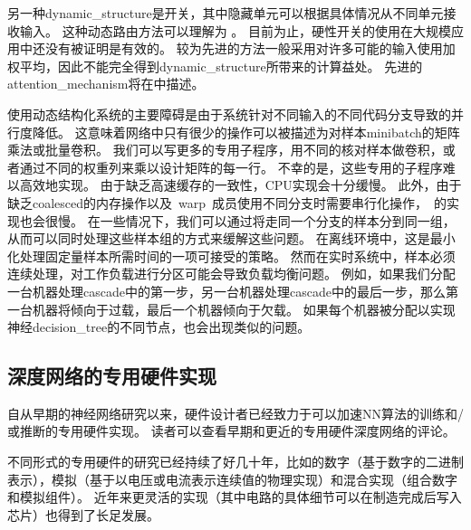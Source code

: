 另一种\gls{dynamic_structure}是开关，其中隐藏单元可以根据具体情况从不同单元接收输入。
这种动态路由方法可以理解为 \citep{Olshausen1993}。
目前为止，硬性开关的使用在大规模应用中还没有被证明是有效的。
较为先进的方法一般采用对许多可能的输入使用加权平均，因此不能完全得到\gls{dynamic_structure}所带来的计算益处。
先进的\gls{attention_mechanism}将在中描述。



使用动态结构化系统的主要障碍是由于系统针对不同输入的不同代码分支导致的并行度降低。
这意味着网络中只有很少的操作可以被描述为对样本\gls{minibatch}的矩阵乘法或批量卷积。
我们可以写更多的专用子程序，用不同的核对样本做卷积，或者通过不同的权重列来乘以设计矩阵的每一行。
不幸的是，这些专用的子程序难以高效地实现。
由于缺乏高速缓存的一致性，CPU实现会十分缓慢。
此外，由于缺乏\gls{coalesced}的内存操作以及~\gls{warp}~成员使用不同分支时需要串行化操作，~的实现也会很慢。
在一些情况下，我们可以通过将走同一个分支的样本分到同一组，从而可以同时处理这些样本组的方式来缓解这些问题。
在离线环境中，这是最小化处理固定量样本所需时间的一项可接受的策略。
然而在实时系统中，样本必须连续处理，对工作负载进行分区可能会导致负载均衡问题。
例如，如果我们分配一台机器处理\gls{cascade}中的第一步，另一台机器处理\gls{cascade}中的最后一步，那么第一台机器将倾向于过载，最后一个机器倾向于欠载。
如果每个机器被分配以实现神经\gls{decision_tree}的不同节点，也会出现类似的问题。


\subsection{深度网络的专用硬件实现}
\label{sec:specialized_hardware_implementations_of_deep_networks}

自从早期的神经网络研究以来，硬件设计者已经致力于可以加速\gls{NN}算法的训练和/或推断的专用硬件实现。
读者可以查看早期和更近的专用硬件深度网络的评论\citep{Lindsey+Lindblad-1994,Beiu-et-al-2003,Misra+Saha-2010}。


不同形式的专用硬件\citep{Graf+Jackel-1989,Mead+Ismail-2012,Kim-et-al-2009,Pham-et-al-2012,Chen-et-al-IEEE2014,Chen-et-al-ACM2014}的研究已经持续了好几十年，比如的数字（基于数字的二进制表示），模拟\citep{Graf+Jackel-1989,Mead+Ismail-2012}（基于以电压或电流表示连续值的物理实现）和混合实现（组合数字和模拟组件）。
近年来更灵活的实现（其中电路的具体细节可以在制造完成后写入芯片）也得到了长足发展。




